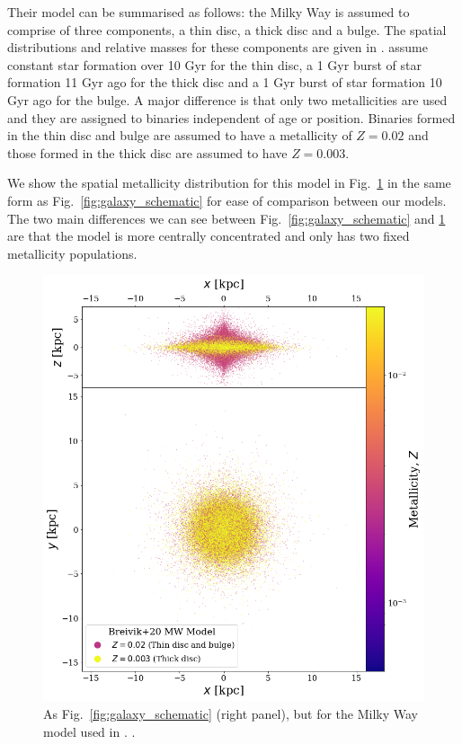 Their model can be summarised as follows: the Milky Way is assumed to comprise of three components, a thin disc, a thick disc and a bulge. The spatial distributions and relative masses for these components are given in \citet{McMillan+2011}. \citet{Breivik+2020} assume constant star formation over 10 Gyr for the thin disc, a 1 Gyr burst of star formation 11 Gyr ago for the thick disc and a 1 Gyr burst of star formation 10 Gyr ago for the bulge. A major difference is that only two metallicities are used and they are assigned to binaries independent of age or position. Binaries formed in the thin disc and bulge are assumed to have a metallicity of $Z = 0.02$ and those formed in the thick disc are assumed to have $Z = 0.003$.

We show the spatial metallicity distribution for this model in Fig.~\ref{fig:simple_mw} in the same form as Fig.~\ref{fig:galaxy_schematic} for ease of comparison between our models. The two main differences we can see between Fig.~\ref{fig:galaxy_schematic} and \ref{fig:simple_mw} are that the \citet{Breivik+2020} model is more centrally concentrated and only has two fixed metallicity populations.

\begin{figure}[htb]
    \centering
    \includegraphics[width=\columnwidth]{../figures/fig11_random_simple_galaxy.png}
    \caption{As Fig.~\ref{fig:galaxy_schematic} (right panel), but for the Milky Way model used in \citet{Breivik+2020}.  \href{https://github.com/TomWagg/detecting-DCOs-in-LISA/blob/main/paper/figures/fig11_random_simple_galaxy.png}{\faFileImage} \href{https://github.com/TomWagg/detecting-DCOs-in-LISA/blob/main/paper/figure_notebooks/galaxy_creation_station.ipynb}{\faBook}.}
    \label{fig:simple_mw}
\end{figure}

